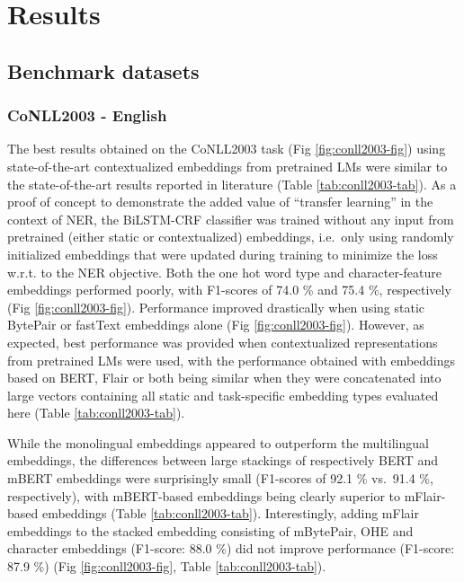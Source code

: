 \documentclass[12pt,a4paper,]{book}
\begin{document}
\hypertarget{results}{%
\chapter{Results}\label{results}}

\hypertarget{benchmark-datasets-1}{%
\section{Benchmark datasets}\label{benchmark-datasets-1}}

\hypertarget{conll2003---english}{%
\subsection{CoNLL2003 - English}\label{conll2003---english}}

The best results obtained on the CoNLL2003 task (Fig \ref{fig:conll2003-fig}) using state-of-the-art contextualized embeddings from pretrained LMs were similar to the state-of-the-art results reported in literature (Table \ref{tab:conll2003-tab}). As a proof of concept to demonstrate the added value of ``transfer learning'' in the context of NER, the BiLSTM-CRF classifier was trained without any input from pretrained (either static or contextualized) embeddings, i.e.~only using randomly initialized embeddings that were updated during training to minimize the loss w.r.t. to the NER objective. Both the one hot word type and character-feature embeddings performed poorly, with F1-scores of 74.0 \% and 75.4 \%, respectively (Fig \ref{fig:conll2003-fig}). Performance improved drastically when using static BytePair or fastText embeddings alone (Fig \ref{fig:conll2003-fig}). However, as expected, best performance was provided when contextualized representations from pretrained LMs were used, with the performance obtained with embeddings based on BERT, Flair or both being similar when they were concatenated into large vectors containing all static and task-specific embedding types evaluated here (Table \ref{tab:conll2003-tab}).

While the monolingual embeddings appeared to outperform the multilingual embeddings, the differences between large stackings of respectively BERT and mBERT embeddings were surprisingly small (F1-scores of 92.1 \% vs.~91.4 \%, respectively), with mBERT-based embeddings being clearly superior to mFlair-based embeddings (Table \ref{tab:conll2003-tab}). Interestingly, adding mFlair embeddings to the stacked embedding consisting of mBytePair, OHE and character embeddings (F1-score: 88.0 \%) did not improve performance (F1-score: 87.9 \%) (Fig \ref{fig:conll2003-fig}, Table \ref{tab:conll2003-tab}).
\end{document}
